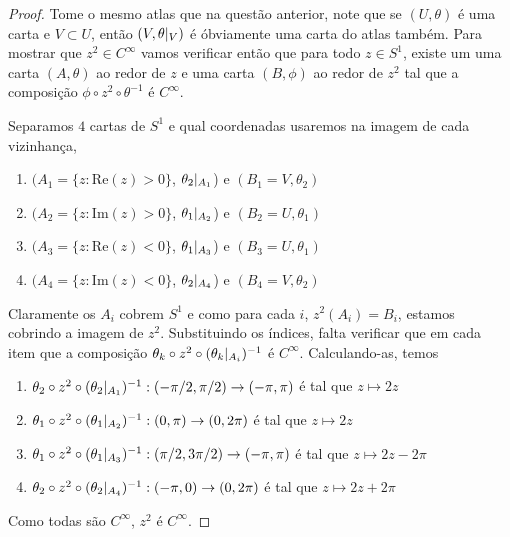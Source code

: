 \begin{problem}
    \label{prob:l2:2} 
\end{problem}
\begin{proof}
    Tome o mesmo atlas que na questão anterior, note que se $(U, \theta)$ é uma carta e $V \subset U$, 
    então $(V, \theta\arrowvert_V)$ é óbviamente uma carta do atlas também.
    Para mostrar que $z^2 \in C^\infty$ vamos verificar então que para todo $z \in S^1$, existe um uma carta $(A, \theta)$ ao redor de $z$
    e uma carta $(B, \phi)$ ao redor de $z^2$ tal que a composição $\phi \circ z^2 \circ \theta^{-1}$ é $C^\infty$.
    
    Separamos $4$ cartas de $S^1$ e qual coordenadas usaremos na imagem de cada vizinhança,
    \begin{enumerate}
        \item $(A_1 = \{z : \text{Re}(z) > 0\}$, $\theta_2\arrowvert_{A_1}$) e  $(B_1 = V, \theta_2)$
        \item $(A_2 = \{z : \text{Im}(z) > 0\}$, $\theta_1\arrowvert_{A_2}$) e  $(B_2 = U, \theta_1)$ 
        \item $(A_3 = \{z : \text{Re}(z) < 0\}$, $\theta_1\arrowvert_{A_3}$) e  $(B_3 = U, \theta_1)$ 
        \item $(A_4 = \{z : \text{Im}(z) < 0\}$, $\theta_2\arrowvert_{A_4}$) e  $(B_4 = V, \theta_2)$  
    \end{enumerate}
    Claramente os $A_i$ cobrem $S^1$ e como para cada $i$, $z^2(A_i) = B_i$, estamos cobrindo a imagem de  $z^2$.
    Substituindo os índices, falta verificar que em cada item que a composição $\theta_k \circ z^2 \circ (\theta_k\arrowvert_{A_i})^{-1}$ é $C^\infty$.
    Calculando-as, temos
    \begin{enumerate}
        \item $\theta_2 \circ z^2 \circ (\theta_2\arrowvert_{A_1})^{-1} : (-\pi/2, \pi/2) \to (-\pi, \pi)$ é tal que $z \mapsto 2z$
        \item $\theta_1 \circ z^2 \circ (\theta_1\arrowvert_{A_2})^{-1} : (0, \pi) \to (0, 2\pi)$ é tal que $z \mapsto 2z$
        \item $\theta_1 \circ z^2 \circ (\theta_1\arrowvert_{A_3})^{-1} : (\pi/2, 3\pi/2) \to (-\pi, \pi)$ é tal que $z \mapsto 2z - 2\pi$
        \item $\theta_2 \circ z^2 \circ (\theta_2\arrowvert_{A_4})^{-1} : (-\pi, 0) \to (0, 2\pi)$ é tal que $z \mapsto 2z + 2\pi$
    \end{enumerate}
    Como todas são $C^\infty$, $z^2$ é $C^\infty$.

\end{proof}

